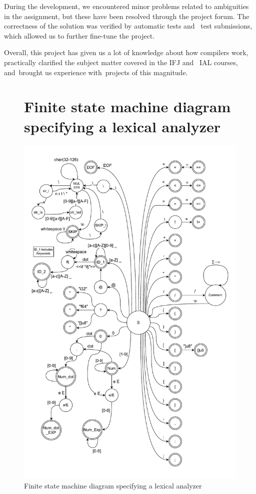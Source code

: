 \documentclass[a4paper, 11pt]{article}
\begin{document}
	During the development, we encountered minor problems related to ambiguities in the assignment, but
	these have been resolved through the project forum. The correctness of the solution was verified by automatic
	tests and ~test submissions, which allowed us to further fine-tune the project.

	Overall, this project has given us a lot of knowledge about how compilers work, practically
	clarified the subject matter covered in the IFJ and ~IAL courses, and~brought us experience with~projects of this magnitude.

	\clearpage
	\appendix

	\begin{figure}[!ht]
        \section{Finite state machine diagram specifying a lexical analyzer}
		\centering
		\includegraphics[width=0.8\linewidth]{FSM.pdf}
		\caption{Finite state machine diagram specifying a lexical analyzer}
		\label{figure:fa_graph}
	\end{figure}
\end{document}
